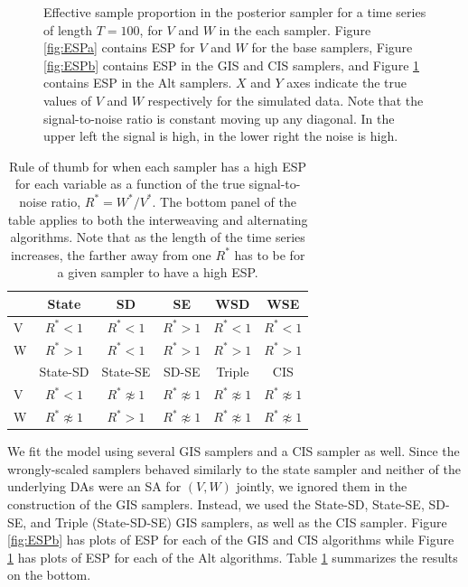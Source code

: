 \documentclass[12pt]{article}
\begin{document}
\begin{figure}[!h]
\begin{subfigure}[b]{0.45\textwidth}
\caption{}
\label{fig:ESPc}
\end{subfigure}
\caption{Effective sample proportion in the posterior sampler for a time series of length $T=100$, for $V$ and $W$ in the each sampler. Figure \ref{fig:ESPa} contains ESP for $V$ and $W$ for the base samplers, Figure \ref{fig:ESPb} contains ESP in the GIS and CIS samplers, and Figure \ref{fig:ESPc} contains ESP in the Alt samplers. $X$ and $Y$ axes indicate the true values of $V$ and $W$ respectively for the simulated data. Note that the signal-to-noise ratio is constant moving up any diagonal. In the upper left the signal is high, in the lower right the noise is high.}
\label{ESplot}
\end{figure}

\setlength{\tabcolsep}{6pt}
\begin{table}
  \centering
  \begin{tabular}{lccccc}\hline
     & State           & SD                 & SE                  & WSD                 & WSE \\\hline
   V & $R^* < 1$       & $R^* < 1$           & $R^* > 1$           & $R^* < 1$           & $R^* < 1$ \\ 
   W & $R^* > 1$       & $R^* < 1$           & $R^* > 1$           & $R^* > 1$           & $R^* > 1$ \\ \hline
     & State-SD        & State-SE            & SD-SE              & Triple              & CIS \\\hline
   V & $R^* < 1$       & $R^* \not\approx 1$ & $R^* \not\approx 1$ & $R^* \not\approx 1$ & $R^* \not\approx 1$ \\
  W  &$R^* \not\approx 1$& $R^* > 1$          & $R^* \not\approx 1$ & $R^* \not\approx 1$ & $R^* \not\approx 1$\\\hline
  \end{tabular}
  \caption{Rule of thumb for when each sampler has a high ESP for each variable as a function of the true signal-to-noise ratio, $R^*=W^*/V^*$. The bottom panel of the table applies to both the interweaving and alternating algorithms. Note that as the length of the time series increases, the farther away from one $R^*$ has to be for a given sampler to have a high ESP.}
  \label{tab:stnmix}
\end{table}

We fit the model using several GIS samplers and a CIS sampler as well. Since the wrongly-scaled samplers behaved similarly to the state sampler and neither of the underlying DAs were an SA for $(V,W)$ jointly, we ignored them in the construction of the GIS samplers. Instead, we used the State-SD, State-SE, SD-SE, and Triple (State-SD-SE) GIS samplers, as well as the CIS sampler. Figure \ref{fig:ESPb} has plots of ESP for each of the GIS and CIS algorithms while Figure \ref{fig:ESPc} has plots of ESP for each of the Alt algorithms. Table \ref{tab:stnmix} summarizes the results on the bottom.
\end{document}
